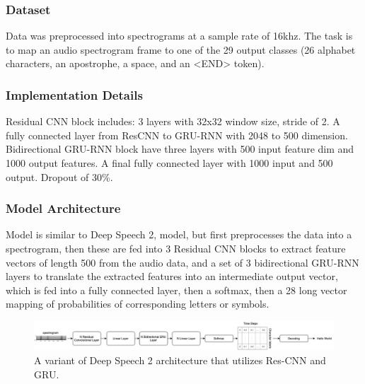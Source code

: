 \subsubsection{Dataset}

Data was preprocessed into spectrograms at a sample rate of 16khz. The task is to map an audio spectrogram frame to one of the 29 output classes (26 alphabet characters, an apostrophe, a space, and an <END> token). 


\subsubsection{Implementation Details}

Residual CNN block includes: 3 layers with 32x32 window size, stride of 2. A fully connected layer from ResCNN to GRU-RNN with 2048 to 500 dimension. Bidirectional GRU-RNN block have three layers with 500 input feature dim and 1000 output features. A final fully connected layer with 1000 input and 500 output. Dropout of 30\%.

\subsubsection{Model Architecture}

Model is similar to Deep Speech 2, model, but first preprocesses the data into a spectrogram, then these are fed into 3 Residual CNN blocks to extract feature vectors of length 500 from the audio data, and a set of 3 bidirectional GRU-RNN layers to translate the extracted features into an intermediate output vector, which is fed into a fully connected layer, then a softmax, then a 28 long vector mapping of probabilities of corresponding letters or symbols.

\begin{figure}[!t]
    \centering
    \includegraphics[width=\linewidth]{img/speech.png}
    \caption{A variant of Deep Speech 2 architecture that utilizes Res-CNN and GRU.}
    \label{fig:deepSpeech}
    \vspace{-10pt}
\end{figure}

